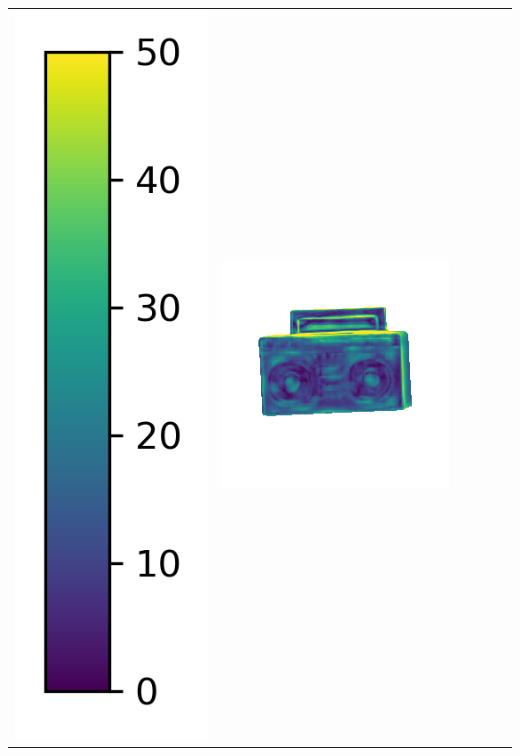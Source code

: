 \begin{tabularx}{\linewidth}{@{}Y@{}Y@{}Y@{}Y@{}Y@{}Y@{}}
\includegraphics[width=0.2\linewidth]{semisynthetic/colorbar_error_vertical.png} &
\includegraphics[width=\linewidth]{semisynthetic/20160617_19_ours_err.png} &

\end{tabularx}
